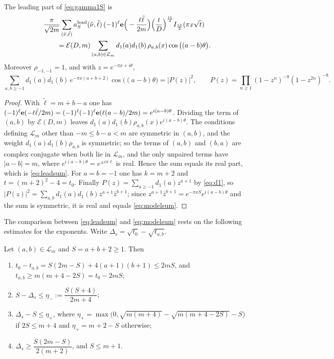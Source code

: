 \begin{theorem}\label{thm:model}
The leading part of \eqref{eq:gamma1S} is
\begin{equation}\label{eq:leadsum}
\begin{split}
&\frac{\pi}{\sqrt{2m}}\sum_{(\tilde\nu,\tilde\ell)}a^{\rm lead}_S(\tilde\nu,\tilde\ell)\,(-1)^\ell\mathbf e\Big(-\frac{\ell\tilde\ell}{2m}\Big)\Big(\frac tD\Big)^{\frac{15}4}I_{\frac{15}2}(\pi x\sqrt t)\\
&\qquad=\mathcal E(D,m)\sum_{(a,b)\in\mathcal L_m}d_1(a)d_1(b)\,\rho_{a,b}(x)\cos\big((a-b)\theta\big).
\end{split}
\end{equation}
Moreover $\rho_{-1,-1}=1$, and with $z=e^{-\pi x+i\theta}$,
\begin{equation}\label{eq:modelsum}
\sum_{a,b\ge-1}d_1(a)d_1(b)\,e^{-\pi x(a+b+2)}\cos\big((a-b)\theta\big)=|P(z)|^2,\qquad P(z)=\prod_{n\ge1}(1-z^n)^{-8}(1-z^{2n})^{-8}.
\end{equation}
\end{theorem}

\begin{proof}
With $\tilde\ell=m+b-a$ one has $(-1)^\ell\mathbf e(-\ell\tilde\ell/2m)=(-1)^\ell(-1)^\ell\mathbf e(\ell(a-b)/2m)=e^{i(a-b)\theta}$. Dividing the term of $(a,b)$ by $\mathcal E(D,m)$ leaves $d_1(a)d_1(b)\rho_{a,b}(x)e^{i(a-b)\theta}$. The conditions defining $\mathcal L_m$ other than $-m\le b-a<m$ are symmetric in $(a,b)$, and the weight $d_1(a)d_1(b)\rho_{a,b}$ is symmetric; so the terms of $(a,b)$ and $(b,a)$ are complex conjugate when both lie in $\mathcal L_m$, and the only unpaired terms have $|a-b|=m$, where $e^{i(a-b)\theta}=e^{\pm i\pi\ell}$ is real. Hence the sum equals its real part, which is \eqref{eq:leadsum}. For $a=b=-1$ one has $k=m+2$ and $t=(m+2)^2-4=t_0$. Finally $P(z)=\sum_{a\ge-1}d_1(a)z^{a+1}$ by \eqref{eq:d1}, so $|P(z)|^2=\sum_{a,b}d_1(a)d_1(b)z^{a+1}\bar z^{b+1}$; since $z^{a+1}\bar z^{b+1}=e^{-\pi xS}e^{i(a-b)\theta}$ and the sum is symmetric, it is real and equals \eqref{eq:modelsum}.
\end{proof}

The comparison between \eqref{eq:leadsum} and \eqref{eq:modelsum} rests on the following estimates for the exponents. Write $\Delta_s=\sqrt{t_0}-\sqrt{t_{a,b}}$.

\begin{lemma}\label{lem:deltas}
Let $(a,b)\in\mathcal L_m$ and $S=a+b+2\ge1$. Then
\begin{enumerate}
\item[(i)] $t_0-t_{a,b}=S(2m-S)+4(a+1)(b+1)\le2mS$, and $t_{a,b}\ge m(m+4-2S)=t_0-2mS$;
\item[(ii)] $S-\Delta_s\le\eta_-:=\dfrac{S(S+4)}{2m+4}$;
\item[(iii)] $\Delta_s-S\le\eta_+$, where $\eta_+=\max\big(0,\sqrt{m(m+4)}-\sqrt{m(m+4-2S)}-S\big)$ if $2S\le m+4$ and $\eta_+=m+2-S$ otherwise;
\item[(iv)] $\Delta_s\ge\dfrac{S(2m-S)}{2(m+2)}$, and $S\le m+1$.
\end{enumerate}
\end{lemma}

